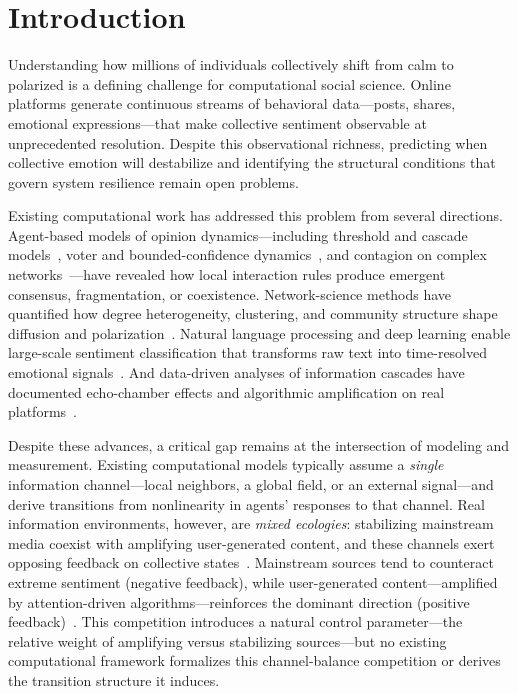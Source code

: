 \documentclass[12pt]{article}
\begin{document}
\section{Introduction}
\label{sec:introduction}

Understanding how millions of individuals collectively shift from calm to polarized is a defining challenge for computational social science. Online platforms generate continuous streams of behavioral data---posts, shares, emotional expressions---that make collective sentiment observable at unprecedented resolution. Despite this observational richness, predicting when collective emotion will destabilize and identifying the structural conditions that govern system resilience remain open problems.

Existing computational work has addressed this problem from several directions. Agent-based models of opinion dynamics---including threshold and cascade models~\cite{Granovetter1978,CentolaMacy2007,WattsDodds2007,Nyborg2016}, voter and bounded-confidence dynamics~\cite{HolleyLiggett1975,SoodRedner2005,Deffuant2000,HegselmannKrause2002}, and contagion on complex networks~\cite{Centola2010,Centola2018Tipping,Iacopini2019,PastorSatorras2015}---have revealed how local interaction rules produce emergent consensus, fragmentation, or coexistence. Network-science methods have quantified how degree heterogeneity, clustering, and community structure shape diffusion and polarization~\cite{Watts2002,Dandekar2013,McPherson2001}. Natural language processing and deep learning enable large-scale sentiment classification that transforms raw text into time-resolved emotional signals~\cite{Brady2023,Kramer2014,Fan2014}. And data-driven analyses of information cascades have documented echo-chamber effects and algorithmic amplification on real platforms~\cite{Bakshy2015,DelVicario2016SciRep,DelVicario2016PNAS,Vosoughi2018,Cinelli2021}.

Despite these advances, a critical gap remains at the intersection of modeling and measurement. Existing computational models typically assume a \emph{single} information channel---local neighbors, a global field, or an external signal---and derive transitions from nonlinearity in agents' responses to that channel. Real information environments, however, are \emph{mixed ecologies}: stabilizing mainstream media coexist with amplifying user-generated content, and these channels exert opposing feedback on collective states~\cite{Chadwick2017,Tornberg2022,Piao2023}. Mainstream sources tend to counteract extreme sentiment (negative feedback), while user-generated content---amplified by attention-driven algorithms---reinforces the dominant direction (positive feedback)~\cite{DelVicario2016SciRep,Vosoughi2018}. This competition introduces a natural control parameter---the relative weight of amplifying versus stabilizing sources---but no existing computational framework formalizes this channel-balance competition or derives the transition structure it induces.
\end{document}
